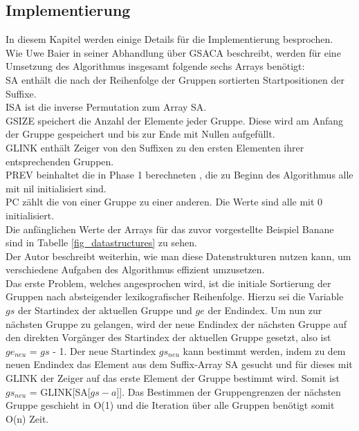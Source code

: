 \newpage
\subsection{Implementierung}
\label{gsaca:chapter5}
%
In diesem Kapitel werden einige Details für die Implementierung besprochen. \\

Wie Uwe Baier in seiner Abhandlung über GSACA beschreibt, werden für eine Umsetzung des Algorithmus insgesamt folgende sechs Arrays benötigt:\\
SA enthält die nach der Reihenfolge der Gruppen sortierten Startpositionen der Suffixe. \\
ISA ist die inverse Permutation zum Array SA. \\
GSIZE speichert die Anzahl der Elemente jeder Gruppe. 
Diese wird am Anfang der Gruppe gespeichert und bis zur Ende mit Nullen aufgefüllt.\\
GLINK enthält Zeiger von den Suffixen zu den ersten Elementen ihrer entsprechenden Gruppen. \\
PREV beinhaltet die in Phase 1 berechneten \prevpointer, die zu Beginn des Algorithmus alle mit nil initialisiert sind.\\
PC zählt die \prevpointer von einer Gruppe zu einer anderen. 
Die Werte sind alle mit 0 initialisiert.\\
Die anfänglichen Werte der Arrays für das zuvor vorgestellte Beispiel Banane sind in Tabelle \ref{fig_datastructures} zu sehen.\\



Der Autor beschreibt weiterhin, wie man diese Datenstrukturen nutzen kann, um verschiedene Aufgaben des Algorithmus effizient umzusetzen.\\

Das erste Problem, welches angesprochen wird, ist die initiale Sortierung der Gruppen nach absteigender lexikografischer Reihenfolge. 
Hierzu sei die Variable $gs$ der Startindex der aktuellen Gruppe und $ge$ der Endindex. 
Um nun zur nächsten Gruppe zu gelangen, wird der neue Endindex der nächsten Gruppe auf den direkten Vorgänger des Startindex der aktuellen Gruppe gesetzt, also ist $ge_{neu}$ = $gs$ - 1. 
Der neue Startindex $gs_{neu}$ kann bestimmt werden, indem zu dem neuen Endindex das Element aus dem Suffix-Array SA gesucht und für dieses mit GLINK der Zeiger auf das erste Element der Gruppe bestimmt wird. 
Somit ist $gs_{neu}$ = GLINK[SA[$gs - a$]]. 
Das Bestimmen der Gruppengrenzen der nächsten Gruppe geschieht in O(1) und die Iteration über alle Gruppen benötigt somit O(n) Zeit.\\

